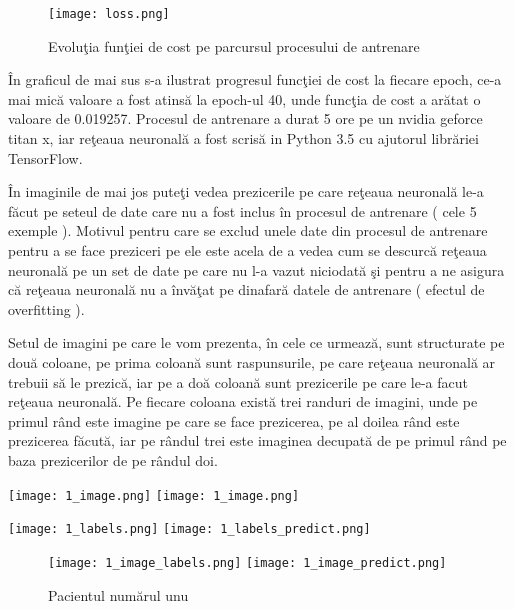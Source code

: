 \begin{figure}[h!]
  \center
  \texttt{[image: loss.png]}
  \caption{Evolu\c{t}ia fun\c{t}iei de cost pe parcursul procesului de antrenare}
\end{figure}

\^{I}n graficul de mai sus s-a ilustrat progresul func\c{t}iei de cost la fiecare epoch, ce-a mai mic\u{a} valoare a fost atins\u{a} la epoch-ul 40, unde func\c{t}ia de cost a ar\u{a}tat o valoare de 0.019257. Procesul de antrenare a durat 5 ore pe un nvidia geforce titan x, iar re\c{t}eaua neuronal\u{a} a fost scris\u{a} in Python 3.5 cu ajutorul libr\u{a}riei TensorFlow.

\^{I}n imaginile de mai jos pute\c{t}i vedea prezicerile pe care re\c{t}eaua neuronal\u{a} le-a f\u{a}cut pe seteul de date care nu a fost inclus \^{i}n procesul de antrenare ( cele 5 exemple ). Motivul pentru care se exclud unele date din procesul de antrenare pentru a se face preziceri pe ele este acela de a vedea cum se descurc\u{a} re\c{t}eaua neuronal\u{a} pe un set de date pe care nu l-a vazut niciodat\u{a} \c{s}i pentru a ne asigura c\u{a} re\c{t}eaua neuronal\u{a} nu a \^{i}nv\u{a}\c{t}at pe dinafar\u{a} datele de antrenare ( efectul de overfitting ).

\par

Setul de imagini pe care le vom prezenta, \^{i}n cele ce urmeaz\u{a}, sunt structurate pe dou\u{a} coloane, pe prima coloan\u{a} sunt raspunsurile, pe care re\c{t}eaua neuronal\u{a} ar trebuii s\u{a} le prezic\u{a}, iar pe a do\u{a} coloan\u{a} sunt prezicerile pe care le-a facut re\c{t}eaua neuronal\u{a}. Pe fiecare coloana exist\u{a} trei randuri de imagini, unde pe primul r\^{a}nd este imagine pe care se face prezicerea, pe al doilea r\^{a}nd este prezicerea f\u{a}cut\u{a}, iar pe r\^{a}ndul trei este imaginea decupat\u{a} de pe primul r\^{a}nd pe baza prezicerilor de pe r\^{a}ndul doi.

\begin{center}
\texttt{[image: 1\_image.png]}
\texttt{[image: 1\_image.png]}
\end{center}

\begin{center}
\texttt{[image: 1\_labels.png]}
\texttt{[image: 1\_labels\_predict.png]}
\end{center}

\begin{figure}[h!]
  \center
  \texttt{[image: 1\_image\_labels.png]}
\texttt{[image: 1\_image\_predict.png]}
  \caption{Pacientul num\u{a}rul unu}
\end{figure}

